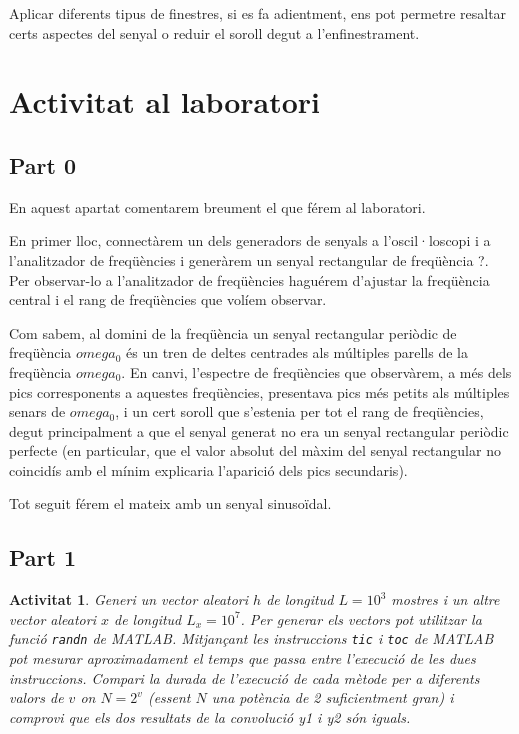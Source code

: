 \documentclass[11pt,a4]{article}
\numberwithin{equation}{section}
\theoremstyle{thmstyle}
\theoremstyle{thmstyle}
\theoremstyle{thmstyle}
\theoremstyle{thmstyle}
\theoremstyle{thmstyle}
\theoremstyle{thmstyle}
\theoremstyle{thmstyle}
\newtheorem{activity}{Activitat}
\begin{document}
Aplicar diferents tipus de finestres, si es fa adientment, ens pot permetre resaltar certs aspectes del senyal o reduir el soroll degut a l'enfinestrament.

\section{Activitat al laboratori}

\subsection{Part 0}

En aquest apartat comentarem breument el que férem al laboratori.

En primer lloc, connectàrem un dels generadors de senyals a l'oscil·loscopi i a l'analitzador de freqüències  i generàrem un senyal rectangular de freqüència ?. Per observar-lo a l'analitzador de freqüències haguérem d'ajustar la freqüència central i el rang de freqüències que volíem observar. 

Com sabem, al domini de la freqüència un senyal rectangular periòdic de freqüència $omega_0$ és un tren de deltes centrades als múltiples parells de la freqüència $omega_0$. En canvi, l'espectre de freqüències que observàrem, a més dels pics corresponents a aquestes freqüències, presentava pics més petits als múltiples senars de $omega_0$, i un cert soroll que s'estenia per tot el rang de freqüències, degut principalment a que el senyal generat no era un senyal rectangular periòdic perfecte (en particular, que el valor absolut del màxim del senyal rectangular no coincidís amb el mínim explicaria l'aparició dels pics secundaris).

Tot seguit férem el mateix amb un senyal sinusoïdal.

\subsection{Part 1}

\begin{activity}
Generi un vector aleatori $h$ de longitud $L=10^3$ mostres i un altre vector aleatori $x$ de longitud $L_x=10^7$. Per generar els vectors pot utilitzar la funció {\tt randn} de MATLAB. Mitjançant les instruccions {\tt tic} i {\tt toc} de MATLAB pot mesurar aproximadament el temps que passa entre l’execució de les dues instruccions. Compari la durada de l’execució de cada mètode per a diferents valors de $v$ on $N=2^v$ (essent $N$ una potència de 2 suficientment gran) i comprovi que els dos resultats de la convolució y1 i y2 són iguals.
\end{activity}
\end{document}
